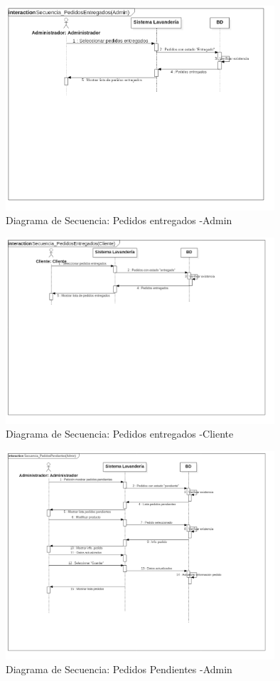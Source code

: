 \begin{figure}[htb]
\begin{center}
\includegraphics[width=10cm]{./imagenes/diagramas/Secuencia_PedidosEntregados(Admin).png}
\end{center}
\caption{Diagrama de Secuencia: Pedidos entregados -Admin}
\end{figure}


\begin{figure}[htb]
\begin{center}
\includegraphics[width=10cm]{./imagenes/diagramas/Secuencia_PedidosEntregados(Cliente).png}
\end{center}
\caption{Diagrama de Secuencia: Pedidos entregados -Cliente}
\end{figure}


\begin{figure}[htb]
\begin{center}
\includegraphics[width=10cm]{./imagenes/diagramas/Secuencia_PedidosPendientes(Admin).png}
\end{center}
\caption{Diagrama de Secuencia: Pedidos Pendientes -Admin }
\end{figure}


